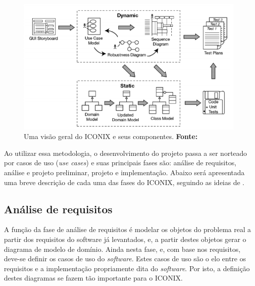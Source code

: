 \begin{figure}[h!]
	\centerline{\includegraphics[scale=0.95]{./imagens/visao_geral_iconix.png}}
	\caption[Uma visão geral do ICONIX e seus componentes.]
	{Uma visão geral do ICONIX e seus componentes. \textbf{Fonte:} }
	\label{fig:exemplo1}
\end{figure}

\newpage %

\par Ao utilizar essa metodologia, o desenvolvimento do projeto passa a ser norteado por casos de uso (\textit{use cases}) e suas principais fases são: análise de requisitos, análise e projeto preliminar, projeto e implementação. Abaixo será apresentada uma breve descrição de cada uma das fases do ICONIX, seguindo as ideias de .

\subsection{Análise de requisitos}

A função da fase de análise de requisitos é modelar os objetos do problema real a partir dos requisitos do software já levantados, e, a partir destes objetos gerar o diagrama de modelo de domínio. Ainda nesta fase, e, com base nos requisitos, deve-se definir os casos de uso do \textit{software}. Estes casos de uso são o elo entre os requisitos e a implementação propriamente dita do \textit{software}. Por isto, a definição destes diagramas se fazem tão importante para o ICONIX. 


